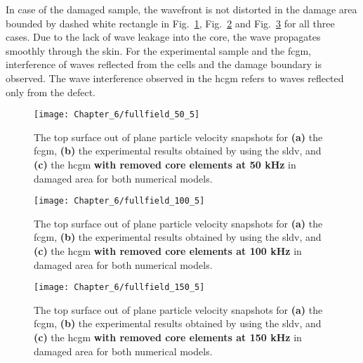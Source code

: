 In case of the damaged sample, the wavefront is not distorted in the damage area bounded by dashed white rectangle in Fig.~\ref{fig:fullfield_50_5}, Fig.~\ref{fig:fullfield_100_5} and Fig.~\ref{fig:fullfield_150_5} for all three cases.
Due to the lack of wave leakage into the core, the wave propagates smoothly through the skin.
For the experimental sample and the \ac{fcgm}, interference of waves reflected from the cells and the damage boundary is observed.
The wave interference observed in the \ac{hcgm} refers to waves reflected only from the defect.

\begin{figure}[!hbt]
	\begin{center}
		\texttt{[image: Chapter\_6/fullfield\_50\_5]}
	\end{center}
	\caption{The top surface out of plane particle velocity snapshots for \textbf{(a)} the \acf{fcgm}, \textbf{(b)} the experimental results obtained by using the \acf{sldv}, and \textbf{(c)} the \acf{hcgm} \textbf{with removed core elements at 50 kHz} in damaged area for both numerical models.}
	\label{fig:fullfield_50_5}
\end{figure}
\begin{figure}[!hbt]
	\begin{center}
		\texttt{[image: Chapter\_6/fullfield\_100\_5]}
	\end{center}
	\caption{The top surface out of plane particle velocity snapshots for \textbf{(a)} the \acf{fcgm}, \textbf{(b)} the experimental results obtained by using the \acf{sldv}, and \textbf{(c)} the \acf{hcgm} \textbf{with removed core elements at 100 kHz} in damaged area for both numerical models.}
	\label{fig:fullfield_100_5}
\end{figure}
\begin{figure}[!hbt]
	\begin{center}
		\texttt{[image: Chapter\_6/fullfield\_150\_5]}
	\end{center}
	\caption{The top surface out of plane particle velocity snapshots for \textbf{(a)} the \acf{fcgm}, \textbf{(b)} the experimental results obtained by using the \acf{sldv}, and \textbf{(c)} the \acf{hcgm} \textbf{with removed core elements at 150 kHz} in damaged area for both numerical models.}
	\label{fig:fullfield_150_5}
\end{figure}
\clearpage